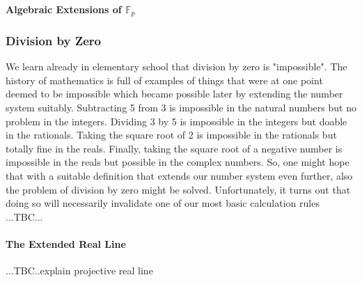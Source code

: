 






\paragraph{Algebraic Extensions of $\mathbb{F}_p$}




\subsubsection{Division by Zero}
We learn already in elementary school that division by zero is "impossible". The history of mathematics is full of examples of things that were at one point deemed to be impossible which became possible later by extending the number system suitably. Subtracting 5 from 3 is impossible in the natural numbers but no problem in the integers. Dividing 3 by 5 is impossible in the integers but doable in the rationals. Taking the square root of 2 is impossible in the rationals but totally fine in the reals. Finally, taking the square root of a negative number is impossible in the reals but possible in the complex numbers. So, one might hope that with a suitable definition that extends our number system even further, also the problem of division by zero might be solved. Unfortunately, it turns out that doing so will necessarily invalidate one of our most basic calculation rules ...TBC...

\paragraph{The Extended Real Line}...TBC..explain projective real line 


